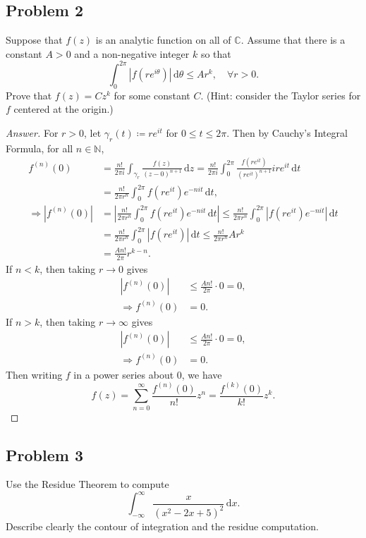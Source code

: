 \documentclass[12pt]{article}
\newcommand{\n}{\mathbb{N}}
\newcommand{\cx}{\mathbb{C}}
\newcommand\paren[1]{\left( #1 \right)}
\newcommand{\abs}[1]{\left| #1 \right|}
\renewcommand{\i}[4]{\int_{#1}^{#2} {#3} \, \mathrm{d} {#4} }
\theoremstyle{definition}
\begin{document}
\subsection{Problem 2}
Suppose that $f(z)$ is an analytic function on all of $\cx$. Assume that there is a constant $A > 0$ and a non-negative integer $k$ so that 
\[
    \i{0}{2\pi}{ \abs{ f \paren{ r e^{i \theta} } } }{\theta} \leq A r^k , \quad \forall r > 0.
\]
Prove that $f(z) = C z^k$ for some constant $C$. (Hint: consider the Taylor series for $f$ centered at the origin.)
\begin{proof}[Answer]
    For $r > 0$, let $\gamma_r(t) \coloneqq r e^{it}$ for $0 \leq t \leq 2\pi$. Then by Cauchy's Integral Formula, for all $n \in \n$, 
    \begin{align*}
        f^{(n)}(0) & = \frac{n!}{2\pi i} \i{\gamma_r}{}{ \frac{f(z)}{ (z - 0)^{n+1} } }{z} = \frac{n!}{2\pi i} \i{0}{2\pi}{ \frac{ f \paren{ r e^{it} } }{ \paren{ r e^{it} }^{n+1} } i r e^{it} }{t} \\ 
        & = \frac{n!}{2\pi r^n} \i{0}{2\pi}{ f \paren{ re^{it} } e^{-nit} }{t} , \\ 
        \Rightarrow \abs{ f^{(n)}(0) } & = \abs{ \frac{n!}{2\pi r^n} \i{0}{2\pi}{ f \paren{ re^{it} } e^{-nit} }{t} } \leq \frac{n!}{2\pi r^n} \i{0}{2\pi}{ \abs{ f \paren{ re^{it} } e^{-nit} } }{t} \\ 
        & = \frac{n!}{2\pi r^n} \i{0}{2\pi}{ \abs{ f \paren{ re^{it} } } }{t} \leq \frac{n!}{2\pi r^n} A r^k \\ 
        & = \frac{A n!}{2\pi } r^{k - n} . 
    \end{align*}
    If $n < k$, then taking $r \to 0$ gives 
    \begin{align*}
        \abs{ f^{(n)}(0) } & \leq \frac{A n!}{2 \pi} \cdot 0 = 0 , \\ 
        \Rightarrow f^{(n)}(0) & = 0 . 
    \end{align*}
    If $n > k$, then taking $r \to \infty$ gives 
    \begin{align*}
        \abs{ f^{(n)}(0) } & \leq \frac{A n!}{2 \pi} \cdot 0 = 0 , \\ 
        \Rightarrow f^{(n)}(0) & = 0 . 
    \end{align*}
    Then writing $f$ in a power series about $0$, we have 
    \[
        f(z) = \sum\limits_{n = 0}^{\infty} \frac{ f^{(n)}(0) }{n!} z^n = \frac{ f^{(k)}(0) }{k!} z^k . 
    \]
\end{proof}

\subsection{Problem 3}
Use the Residue Theorem to compute 
\[
    \i{-\infty}{\infty}{ \frac{x}{ (x^2 - 2x + 5)^2 } }{x} . 
\]
Describe clearly the contour of integration and the residue computation.
\end{document}
